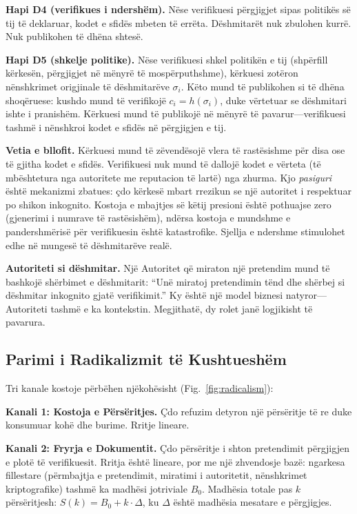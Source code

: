 \documentclass[11pt,a4paper,twocolumn]{article}
\begin{document}
\textbf{Hapi D4 (verifikues i ndershëm).} Nëse verifikuesi përgjigjet sipas politikës së tij të deklaruar, kodet e sfidës mbeten të errëta. Dëshmitarët nuk zbulohen kurrë. Nuk publikohen të dhëna shtesë.

\textbf{Hapi D5 (shkelje politike).} Nëse verifikuesi shkel politikën e tij (shpërfill kërkesën, përgjigjet në mënyrë të mospërputhshme), kërkuesi zotëron nënshkrimet origjinale të dëshmitarëve $\sigma_i$. Këto mund të publikohen si të dhëna shoqëruese: kushdo mund të verifikojë $c_i = h(\sigma_i)$, duke vërtetuar se dëshmitari ishte i pranishëm. Kërkuesi mund të publikojë në mënyrë të pavarur---verifikuesi tashmë i nënshkroi kodet e sfidës në përgjigjen e tij.

\textbf{Vetia e bllofit.} Kërkuesi mund të zëvendësojë vlera të rastësishme për disa ose të gjitha kodet e sfidës. Verifikuesi nuk mund të dallojë kodet e vërteta (të mbështetura nga autoritete me reputacion të lartë) nga zhurma. Kjo \emph{pasiguri} është mekanizmi zbatues: çdo kërkesë mbart rrezikun se një autoritet i respektuar po shikon inkognito. Kostoja e mbajtjes së këtij presioni është pothuajse zero (gjenerimi i numrave të rastësishëm), ndërsa kostoja e mundshme e pandershmërisë për verifikuesin është katastrofike. Sjellja e ndershme stimulohet edhe në mungesë të dëshmitarëve realë.

\textbf{Autoriteti si dëshmitar.} Një Autoritet që miraton një pretendim mund të bashkojë shërbimet e dëshmitarit: ``Unë miratoj pretendimin tënd dhe shërbej si dëshmitar inkognito gjatë verifikimit.'' Ky është një model biznesi natyror---Autoriteti tashmë e ka kontekstin. Megjithatë, dy rolet janë logjikisht të pavarura.

\subsection{Parimi i Radikalizmit të Kushtueshëm}

Tri kanale kostoje përbëhen njëkohësisht (Fig.~\ref{fig:radicalism}):

\textbf{Kanali 1: Kostoja e Përsëritjes.} Çdo refuzim detyron një përsëritje të re duke konsumuar kohë dhe burime. Rritje lineare.

\textbf{Kanali 2: Fryrja e Dokumentit.} Çdo përsëritje i shton pretendimit përgjigjen e plotë të verifikuesit. Rritja është lineare, por me një zhvendosje bazë: ngarkesa fillestare (përmbajtja e pretendimit, miratimi i autoritetit, nënshkrimet kriptografike) tashmë ka madhësi jotriviale $B_0$. Madhësia totale pas $k$ përsëritjesh: $S(k) = B_0 + k \cdot \Delta$, ku $\Delta$ është madhësia mesatare e përgjigjes.
\end{document}
